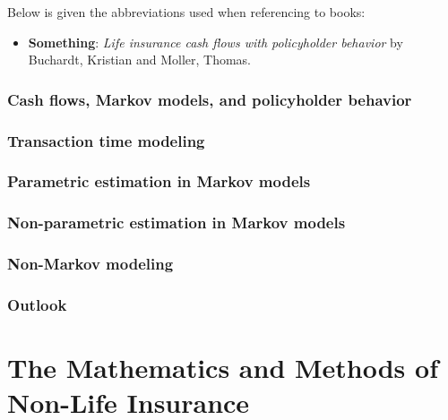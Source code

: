 \documentclass[a4paper,12pt,openany]{book}
\providecommand{\tightlist}{%
 \setlength{\itemsep}{0pt}\setlength{\parskip}{0pt}}
\begin{document}
Below is given the abbreviations used when referencing to books:

\begin{itemize}
\tightlist
\item
  \textbf{Something}: \emph{Life insurance cash flows with policyholder behavior} by Buchardt, Kristian and Moller, Thomas.
\end{itemize}

\hypertarget{cash-flows-markov-models-and-policyholder-behavior}{%
\section{Cash flows, Markov models, and policyholder behavior}\label{cash-flows-markov-models-and-policyholder-behavior}}

\hypertarget{transaction-time-modeling}{%
\section{Transaction time modeling}\label{transaction-time-modeling}}

\hypertarget{parametric-estimation-in-markov-models}{%
\section{Parametric estimation in Markov models}\label{parametric-estimation-in-markov-models}}

\hypertarget{non-parametric-estimation-in-markov-models}{%
\section{Non-parametric estimation in Markov models}\label{non-parametric-estimation-in-markov-models}}

\hypertarget{non-markov-modeling}{%
\section{Non-Markov modeling}\label{non-markov-modeling}}

\hypertarget{outlook}{%
\section{Outlook}\label{outlook}}

\hypertarget{part-the-mathematics-and-methods-of-non-life-insurance}{%
\part{The Mathematics and Methods of Non-Life Insurance}\label{part-the-mathematics-and-methods-of-non-life-insurance}}
\end{document}
